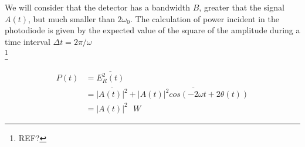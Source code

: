 \begin{bibunit}[plain]
We will consider that the detector has a bandwidth $B$, greater that the signal $A(t)$, but much smaller than $2 \omega_0$. The calculation of power incident in the photodiode is given by the expected value of the square of the amplitude during a time interval $\Delta t = 2 \pi / \omega$\\
\footnote{REF?}


\begin{align}
	P(t)	&= \overline{E_R^2(t)}\nonumber\\
			&= \overline{|A(t)|^2} + \overline{ |A(t)|^2 cos\left(-2 \omega t + 2\theta(t)\right)}\nonumber\\
         &= |A(t)|^2 \,\,\,\, W
\end{align}



\end{bibunit}
